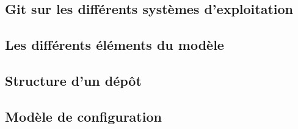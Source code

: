 \subsection{Git sur les différents systèmes d'exploitation}\label{GitOS} %

\subsection{Les différents éléments du modèle} %



\subsection{Structure d'un dépôt} %

\subsection{Modèle de configuration} %
